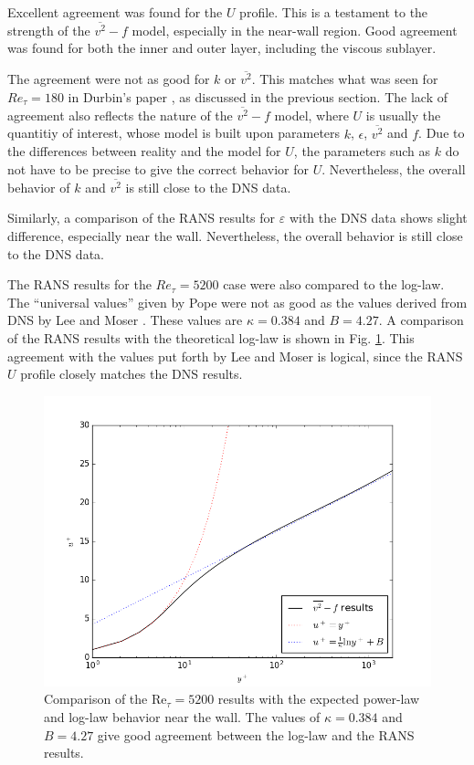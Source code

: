 \documentclass[a4paper,11pt]{article}
\begin{document}
Excellent agreement was found for the $U$ profile.  This is a testament to the strength of the $\overline{v^2}-f$ model, especially in the near-wall region.  Good agreement was found for both the inner and outer layer, including the viscous sublayer.

The agreement were not as good for $k$ or $\overline{v^2}$.  This matches what was seen for $Re_{\tau} = 180$ in Durbin's paper \cite{durbin180}, as discussed in the previous section.  The lack of agreement also reflects the nature of the $\overline{v^2}-f$ model, where $U$ is usually the quantitiy of interest, whose model is built upon parameters $k$, $\epsilon$, $\overline{v^2}$ and $f$.  Due to the differences between reality and the model for $U$, the parameters such as $k$ do not have to be precise to give the correct behavior for $U$. Nevertheless, the overall behavior of $k$ and $\overline{v^2}$ is still close to the DNS data.

Similarly, a comparison of the RANS results for $\varepsilon$ with the DNS data shows slight difference, especially near the wall. Nevertheless, the overall behavior is still close to the DNS data.

The RANS results for the $Re_{\tau} = 5200$ case were also compared to the log-law.  The ``universal values'' given by Pope \cite{pope} were not as good as the values derived from DNS by Lee and Moser \cite{Lee}.  These values are $\kappa = 0.384$ and $B = 4.27$.  A comparison of the RANS results with the theoretical log-law is shown in Fig. \ref{fig:loglaw}. This agreement with the values put forth by Lee and Moser is logical, since the RANS $U$ profile closely matches the DNS results.

\begin{figure}
 \centering
 \includegraphics[width=\textwidth]{loglaw_5200}
 \caption{Comparison of the $\mathrm{Re}_{\tau} = 5200$ results with the expected power-law and log-law behavior near the wall. The values of $\kappa = 0.384$ and $B = 4.27$ give good agreement between the log-law and the RANS results.}
 \label{fig:loglaw}
\end{figure}
\end{document}
